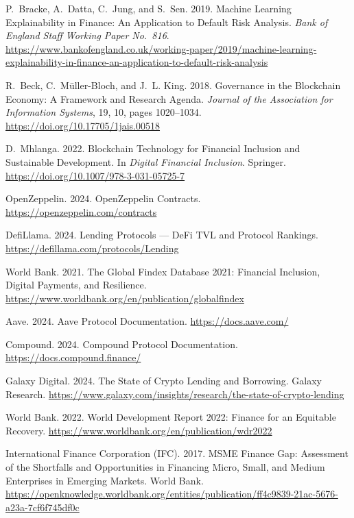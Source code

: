 \documentclass[12pt,a4paper]{report}
\begin{document}
{\begin{enumerate}[label={[\arabic*]}]
\item P.~Bracke, A.~Datta, C.~Jung, and S.~Sen. 2019. Machine Learning Explainability in Finance: An Application to Default Risk Analysis. \emph{Bank of England Staff Working Paper No.~816}. \url{https://www.bankofengland.co.uk/working-paper/2019/machine-learning-explainability-in-finance-an-application-to-default-risk-analysis}

\item R.~Beck, C.~M\"{u}ller-Bloch, and J.~L. King. 2018. Governance in the Blockchain Economy: A Framework and Research Agenda. \emph{Journal of the Association for Information Systems}, 19, 10, pages 1020--1034. \url{https://doi.org/10.17705/1jais.00518}

\item D.~Mhlanga. 2022. Blockchain Technology for Financial Inclusion and Sustainable Development. In \emph{Digital Financial Inclusion}. Springer. \url{https://doi.org/10.1007/978-3-031-05725-7}

\item OpenZeppelin. 2024. OpenZeppelin Contracts. \url{https://openzeppelin.com/contracts}

\item DefiLlama. 2024. Lending Protocols --- DeFi TVL and Protocol Rankings. \url{https://defillama.com/protocols/Lending}

\item World Bank. 2021. The Global Findex Database 2021: Financial Inclusion, Digital Payments, and Resilience. \url{https://www.worldbank.org/en/publication/globalfindex}

\item Aave. 2024. Aave Protocol Documentation. \url{https://docs.aave.com/}

\item Compound. 2024. Compound Protocol Documentation. \url{https://docs.compound.finance/}

\item Galaxy Digital. 2024. The State of Crypto Lending and Borrowing. Galaxy Research. \url{https://www.galaxy.com/insights/research/the-state-of-crypto-lending}

\item World Bank. 2022. World Development Report 2022: Finance for an Equitable Recovery. \url{https://www.worldbank.org/en/publication/wdr2022}

\item International Finance Corporation (IFC). 2017. MSME Finance Gap: Assessment of the Shortfalls and Opportunities in Financing Micro, Small, and Medium Enterprises in Emerging Markets. World Bank. \url{https://openknowledge.worldbank.org/entities/publication/ff4c9839-21ac-5676-a23a-7cf6f745df0c}


\end{enumerate}}
\end{document}
